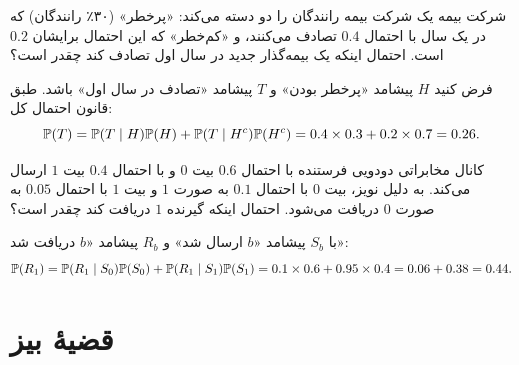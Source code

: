 \begin{example}[label=ex:insurance]{شرکت بیمه}
یک شرکت بیمه رانندگان را دو دسته می‌کند: «پرخطر» (۳۰٪ رانندگان) که در یک سال با احتمال $0.4$ تصادف می‌کنند، و «کم‌خطر» که این احتمال برایشان $0.2$ است. احتمال اینکه یک بیمه‌گذار جدید در سال اول تصادف کند چقدر است؟
\begin{solution}
فرض کنید $H$ پیشامد «پرخطر بودن» و $T$ پیشامد «تصادف در سال اول» باشد. طبق قانون احتمال کل:
\[ \P(T)=\P(T\mid H)\P(H)+\P(T\mid H^c)\P(H^c)=0.4\times0.3+0.2\times0.7=0.26. \]
\end{solution}
\end{example}

\begin{example}[label=ex:channel]{کانال مخابراتی دودویی}
فرستنده با احتمال $0.6$ بیت $0$ و با احتمال $0.4$ بیت $1$ ارسال می‌کند. به دلیل نویز، بیت $0$ با احتمال $0.1$ به صورت $1$ و بیت $1$ با احتمال $0.05$ به صورت $0$ دریافت می‌شود. احتمال اینکه گیرنده $1$ دریافت کند چقدر است؟
\begin{center}
\end{center}
\begin{solution}
با $S_b$ پیشامد «$b$ ارسال شد» و $R_b$ پیشامد «$b$ دریافت شد»:
\[ \P(R_1)=\P(R_1\mid S_0)\P(S_0)+\P(R_1\mid S_1)\P(S_1)=0.1\times0.6+0.95\times0.4=0.06+0.38=0.44. \]
\end{solution}
\end{example}

\section{قضیهٔ بیز}

